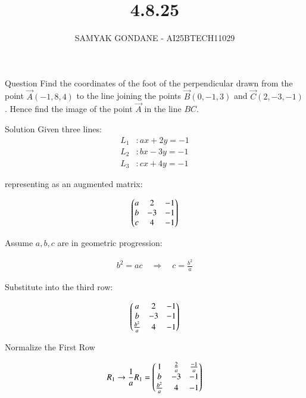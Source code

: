 \documentclass{beamer}
\title 
{4.8.25}
\date{}
\author
{SAMYAK GONDANE - AI25BTECH11029}
\begin{document}
\frame{\titlepage}

\begin{frame}{Question}
Find the coordinates of the foot of the perpendicular drawn from the point $\vec{A}(-1, 8, 4)$ to the line joining the points $\vec{B}(0, -1, 3)$ and $\vec{C}(2, -3, -1)$. Hence find the image of the point $\vec{A}$ in the line $BC$.
\end{frame}

\begin{frame}{Solution}
Given three lines:
\begin{align}
L_1 &: ax + 2y = -1 \\
L_2 &: bx - 3y = -1 \\
L_3 &: cx + 4y = -1
\end{align}
\end{frame}

\begin{frame}
representing as an augmented matrix:

\begin{align}
\begin{pmatrix}
a & 2 & -1 \\
b & -3 & -1 \\
c & 4 & -1
\end{pmatrix}
\end{align}

Assume $a, b, c$ are in geometric progression:

\begin{align}
b^2 = ac \quad \Rightarrow \quad c = \frac{b^2}{a}
\end{align}
\end{frame}

\begin{frame}
Substitute into the third row:

\begin{align}
\begin{pmatrix}
a & 2 & -1 \\
b & -3 & -1 \\
\frac{b^2}{a} & 4 & -1
\end{pmatrix}
\end{align}

Normalize the First Row

\begin{align}
R_1 \rightarrow \frac{1}{a} R_1 = 
\begin{pmatrix}
1 & \frac{2}{a} & \frac{-1}{a} \\
b & -3 & -1 \\
\frac{b^2}{a} & 4 & -1
\end{pmatrix}
\end{align}
\end{frame}
\end{document}
